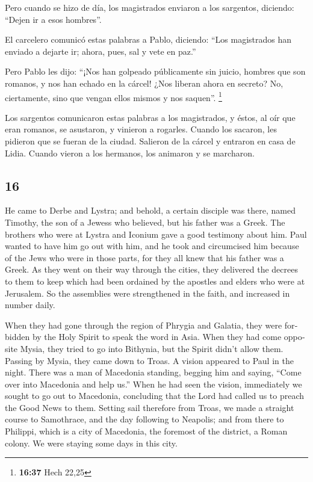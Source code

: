 \begin{paracol}{2}
 Pero cuando se hizo de día, los magistrados enviaron a
los sargentos, diciendo: ``Dejen ir a esos hombres''.

 El carcelero comunicó estas palabras a Pablo, diciendo:
``Los magistrados han enviado a dejarte ir; ahora, pues, sal y vete en
paz.''

 Pero Pablo les dijo: ``¡Nos han golpeado públicamente
sin juicio, hombres que son romanos, y nos han echado en la cárcel! ¿Nos
liberan ahora en secreto? No, ciertamente, sino que vengan ellos mismos
y nos saquen''. \footnote{\textbf{16:37} Hech 22,25}

 Los sargentos comunicaron estas palabras a los
magistrados, y éstos, al oír que eran romanos, se asustaron,
 y vinieron a rogarles. Cuando los sacaron, les pidieron
que se fueran de la ciudad.  Salieron de la cárcel y
entraron en casa de Lidia. Cuando vieron a los hermanos, los animaron y
se marcharon.

\switchcolumn
\begin{otherlanguage}{english}

\hypertarget{section-31}{%
\section{16}\label{section-31}}

 He came to Derbe and Lystra; and behold, a certain
disciple was there, named Timothy, the son of a Jewess who believed, but
his father was a Greek.  The brothers who were at Lystra
and Iconium gave a good testimony about him.  Paul wanted
to have him go out with him, and he took and circumcised him because of
the Jews who were in those parts, for they all knew that his father was
a Greek.  As they went on their way through the cities,
they delivered the decrees to them to keep which had been ordained by
the apostles and elders who were at Jerusalem.  So the
assemblies were strengthened in the faith, and increased in number
daily.

 When they had gone through the region of Phrygia and
Galatia, they were forbidden by the Holy Spirit to speak the word in
Asia.  When they had come opposite Mysia, they tried to go
into Bithynia, but the Spirit didn't allow them.  Passing
by Mysia, they came down to Troas.  A vision appeared to
Paul in the night. There was a man of Macedonia standing, begging him
and saying, ``Come over into Macedonia and help us.'' 
When he had seen the vision, immediately we sought to go out to
Macedonia, concluding that the Lord had called us to preach the Good
News to them.  Setting sail therefore from Troas, we made
a straight course to Samothrace, and the day following to Neapolis;
 and from there to Philippi, which is a city of
Macedonia, the foremost of the district, a Roman colony. We were staying
some days in this city.


\end{otherlanguage}
\end{paracol}
